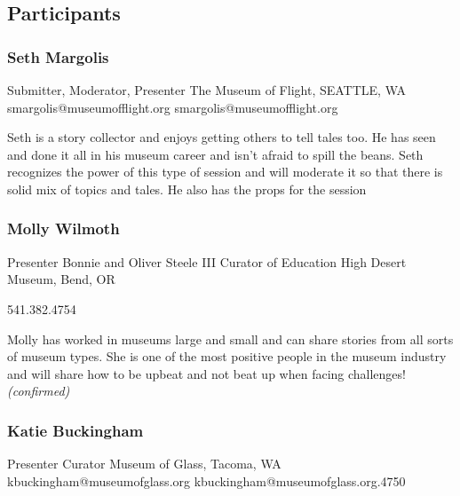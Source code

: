 \documentclass{report}
\begin{document}
            \subsection*{Participants}
              \subsubsection*{ Seth Margolis }
              Submitter, Moderator, Presenter\newline
              \newline
              The Museum of Flight, SEATTLE, WA
              \newline
              smargolis@museumofflight.org\newline
              smargolis@museumofflight.org\newline

              Seth is a story collector and enjoys getting others to tell tales too. He has seen and done it all in his museum career and isn’t afraid to spill the beans. Seth recognizes the power of this type of session and will moderate it so that there is solid mix of topics and tales. He also has the props for the session\newline


              

              
                \subsubsection*{ Molly Wilmoth }
                Presenter\newline
                Bonnie and Oliver Steele III Curator of Education\newline
                High Desert Museum, Bend, OR
                \newline
                
                
                541.382.4754\newline

                Molly has worked in museums large and small and can share stories from all sorts of museum types. She is one of the most positive people in the museum industry and will share how to be upbeat and not beat up when facing challenges!
                \emph{ (confirmed) }
              

              
                \subsubsection*{ Katie Buckingham }
                Presenter\newline
                Curator\newline
                Museum of Glass, Tacoma, WA
                \newline
                kbuckingham@museumofglass.org\newline
                kbuckingham@museumofglass.org.4750\newline
\end{document}
